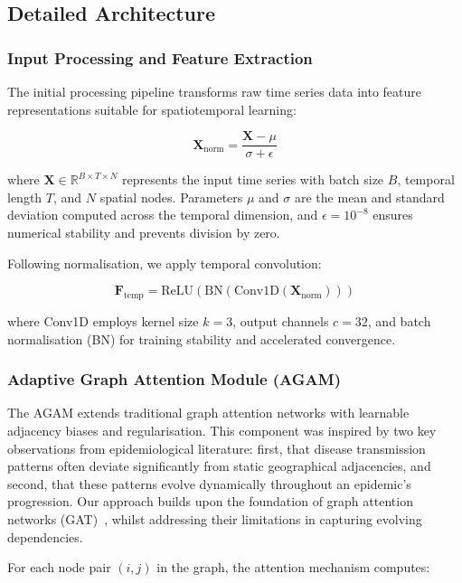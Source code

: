 \documentclass[lettersize, journal]{IEEEtran}
\begin{document}
\subsection{Detailed Architecture}

\subsubsection{Input Processing and Feature Extraction}
The initial processing pipeline transforms raw time series data into feature representations suitable for spatiotemporal learning:

\begin{equation}
\mathbf{X}_{\text{norm}} = \frac{\mathbf{X} - \mu}{\sigma + \epsilon}
\end{equation}

where $\mathbf{X} \in \mathbb{R}^{B \times T \times N}$ represents the input time series with batch size $B$, temporal length $T$, and $N$ spatial nodes. Parameters $\mu$ and $\sigma$ are the mean and standard deviation computed across the temporal dimension, and $\epsilon = 10^{-8}$ ensures numerical stability and prevents division by zero.

Following normalisation, we apply temporal convolution:

\begin{equation}
\mathbf{F}_{\text{temp}} = \text{ReLU}(\text{BN}(\text{Conv1D}(\mathbf{X}_{\text{norm}})))
\end{equation}

where Conv1D employs kernel size $k=3$, output channels $c=32$, and batch normalisation (BN) for training stability and accelerated convergence.

\subsubsection{Adaptive Graph Attention Module (AGAM)}
The AGAM extends traditional graph attention networks with learnable adjacency biases and regularisation. This component was inspired by two key observations from epidemiological literature: first, that disease transmission patterns often deviate significantly from static geographical adjacencies, and second, that these patterns evolve dynamically throughout an epidemic's progression. Our approach builds upon the foundation of graph attention networks (GAT)~\cite{gat}, whilst addressing their limitations in capturing evolving dependencies.

For each node pair $(i,j)$ in the graph, the attention mechanism computes:
\end{document}
